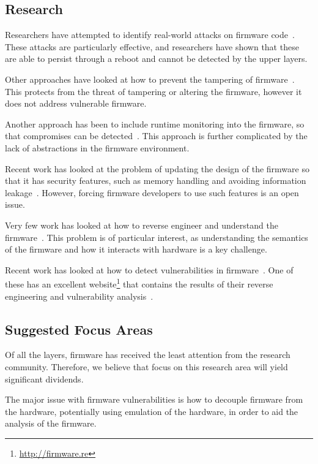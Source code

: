 \documentclass[11pt,letterpaper]{article}
\begin{document}
\subsection{Research}

Researchers have attempted to identify real-world attacks on firmware
code~\cite{Tsow2006, Cui2010, Duflot2011, Basnight2013, Cui2013,
  Zaddach2013, Zaddach2013a, Maskiewicz2014, Stuttgen2015}. These
attacks are particularly effective, and researchers have shown that
these are able to persist through a reboot and cannot be detected by
the upper layers. 

Other approaches have looked at how to prevent the tampering of
firmware~\cite{Adelstein2002, Zhou2007, Zhou2009}. This protects from
the threat of tampering or altering the firmware, however it does not
address vulnerable firmware. 

Another approach has been to include runtime monitoring into the
firmware, so that compromises can be detected~\cite{Cui2010a,
  Cui2011}. This approach is further complicated by the lack of
abstractions in the firmware environment. 

Recent work has looked at the problem of updating the design of the
firmware so that it has security features, such as memory handling and
avoiding information leakage~\cite{Koeberl2014, Kauer2007}. However,
forcing firmware developers to use such features is an open issue.

Very few work has looked at how to reverse engineer and understand the
firmware~\cite{Zaddach2014}. This problem is of particular interest,
as understanding the semantics of the firmware and how it interacts
with hardware is a key challenge. 

Recent work has looked at how to detect vulnerabilities in
firmware~\cite{Davidson2013, Costin2014, Shoshitaishvili2015}. One of
these has an excellent website\footnote{\url{http://firmware.re}}
that contains the results of their reverse engineering and
vulnerability analysis~\cite{Costin2014}.

\subsection{Suggested Focus Areas}

Of all the layers, firmware has received the least attention from the
research community. Therefore, we believe that focus on this research
area will yield significant dividends. 

The major issue with firmware vulnerabilities is how to decouple
firmware from the hardware, potentially using emulation of the
hardware, in order to aid the analysis of the firmware. 
\end{document}
